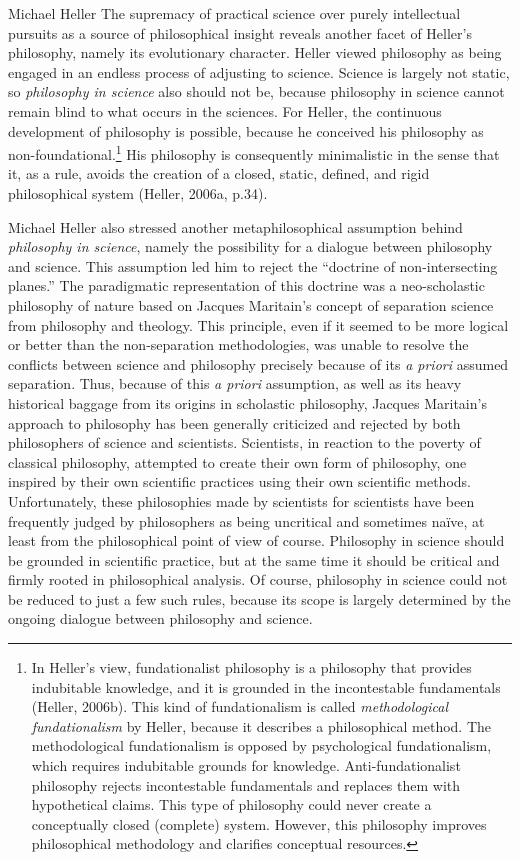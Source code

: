 \begin{artengenv}{Michael Heller}
The supremacy of practical science over purely intellectual pursuits as a source of philosophical insight reveals
another facet of Heller’s philosophy, namely its evolutionary character. Heller viewed philosophy as being engaged in
an endless process of adjusting to science. Science is largely not static, so \textit{philosophy in science }also
should not be, because philosophy in science cannot remain blind to what occurs in the sciences. For Heller, the
continuous development of philosophy is possible, because he conceived his philosophy as non-foundational.\footnote{In
Heller’s view, fundationalist philosophy is a philosophy that provides indubitable knowledge, and it is grounded in the
incontestable fundamentals (Heller, 2006b). This kind of fundationalism is called \textit{methodological fundationalism
}by Heller, because it describes a philosophical method. The methodological fundationalism is opposed by psychological
fundationalism, which requires indubitable grounds for knowledge. Anti-fundationalist philosophy rejects incontestable
fundamentals and replaces them with hypothetical claims. This type of philosophy could never create a conceptually
closed (complete) system. However, this philosophy improves philosophical methodology and clarifies conceptual
resources.} His philosophy is consequently minimalistic in the sense that it, as a rule, avoids the creation of a
closed, static, defined, and rigid philosophical system (Heller, 2006a, p.34).

Michael Heller also stressed another metaphilosophical assumption behind \textit{philosophy in science}, namely the
possibility for a dialogue between philosophy and science. This assumption led him to reject the “doctrine of
non-intersecting planes.” The paradigmatic representation of this doctrine was a neo-scholastic philosophy of nature
based on Jacques Maritain’s concept of separation science from philosophy and theology. This principle, even if it
seemed to be more logical or better than the non-separation methodologies, was unable to resolve the conflicts between
science and philosophy precisely because of its \textit{a priori} assumed separation. Thus, because of this\textit{ a
priori} assumption, as well as its heavy historical baggage from its origins in scholastic philosophy, Jacques
Maritain’s approach to philosophy has been generally criticized and rejected by both philosophers of science and
scientists. Scientists, in reaction to the poverty of classical philosophy, attempted to create their own form of
philosophy, one inspired by their own scientific practices using their own scientific methods. Unfortunately, these
philosophies made by scientists for scientists have been frequently judged by philosophers as being uncritical and
sometimes naïve, at least from the philosophical point of view of course. Philosophy in science should be grounded in
scientific practice, but at the same time it should be critical and firmly rooted in philosophical analysis. Of course,
philosophy in science could not be reduced to just a few such rules, because its scope is largely determined by the
ongoing dialogue between philosophy and science. 


\end{artengenv}
